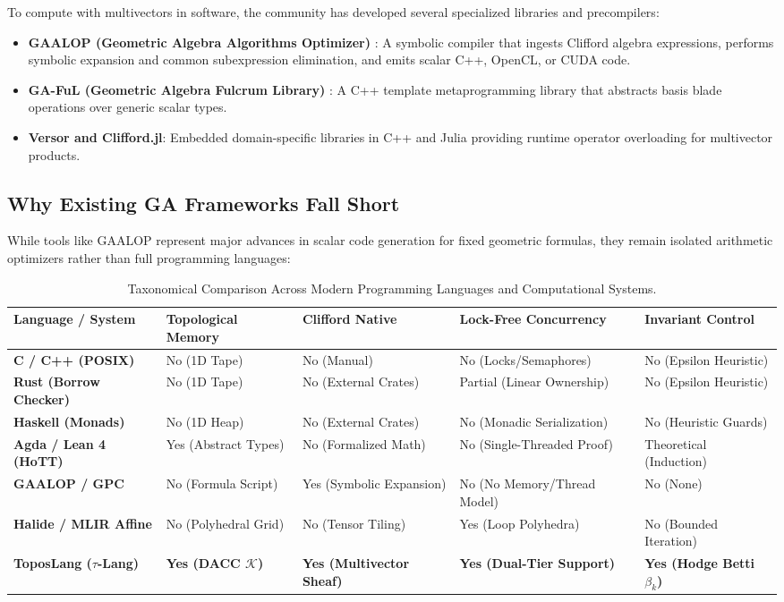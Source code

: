 To compute with multivectors in software, the community has developed several specialized libraries and precompilers:
\begin{itemize}[leftmargin=1.5cm]
    \item \textbf{GAALOP (Geometric Algebra Algorithms Optimizer)} \cite{hildenbrand2012foundations}: A symbolic compiler that ingests Clifford algebra expressions, performs symbolic expansion and common subexpression elimination, and emits scalar C++, OpenCL, or CUDA code.
    \item \textbf{GA-FuL (Geometric Algebra Fulcrum Library)} \cite{trindade2024developing}: A C++ template metaprogramming library that abstracts basis blade operations over generic scalar types.
    \item \textbf{Versor and Clifford.jl}: Embedded domain-specific libraries in C++ and Julia providing runtime operator overloading for multivector products.
\end{itemize}

\subsection{Why Existing GA Frameworks Fall Short}
While tools like GAALOP represent major advances in scalar code generation for fixed geometric formulas, they remain isolated arithmetic optimizers rather than full programming languages:

\begin{table}[t]
\centering
\small
\renewcommand{\arraystretch}{1.2}
\begin{tabular}{@{} l p{5cm} p{6cm} @{}}
\toprule
\textbf{Language / System} & \textbf{Topological Memory} & \textbf{Clifford Native} & \textbf{Lock-Free Concurrency} & \textbf{Invariant Control} \\
\midrule
\textbf{C / C++ (POSIX)} & No (1D Tape) & No (Manual) & No (Locks/Semaphores) & No (Epsilon Heuristic) \\
\textbf{Rust (Borrow Checker)} & No (1D Tape) & No (External Crates) & Partial (Linear Ownership) & No (Epsilon Heuristic) \\
\textbf{Haskell (Monads)} & No (1D Heap) & No (External Crates) & No (Monadic Serialization) & No (Heuristic Guards) \\
\textbf{Agda / Lean 4 (HoTT)} & Yes (Abstract Types) & No (Formalized Math) & No (Single-Threaded Proof) & Theoretical (Induction) \\
\textbf{GAALOP / GPC} & No (Formula Script) & Yes (Symbolic Expansion) & No (No Memory/Thread Model) & No (None) \\
\textbf{Halide / MLIR Affine} & No (Polyhedral Grid) & No (Tensor Tiling) & Yes (Loop Polyhedra) & No (Bounded Iteration) \\
\textbf{ToposLang ($\tau$-Lang)} & \textbf{Yes (DACC $\mathcal{K}$)} & \textbf{Yes (Multivector Sheaf)} & \textbf{Yes (Dual-Tier Support)} & \textbf{Yes (Hodge Betti $\beta_k$)} \\
\bottomrule
\end{tabular}
\caption{Taxonomical Comparison Across Modern Programming Languages and Computational Systems.}
\label{tab:taxonomical_matrix}
\end{table}

